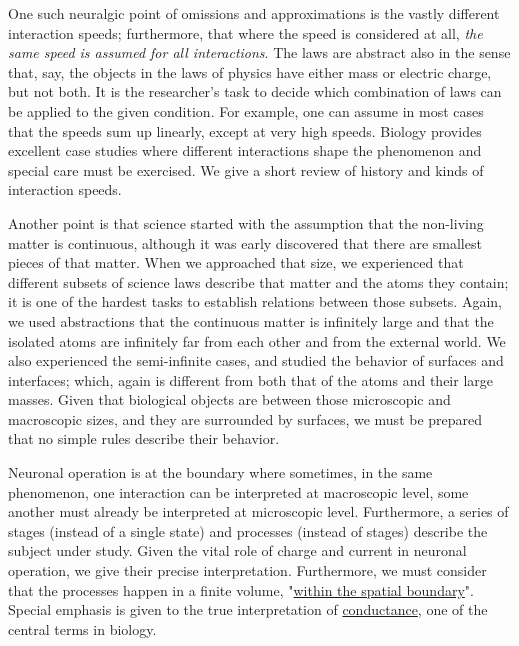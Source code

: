 {
One such neuralgic point of omissions and approximations is  the vastly different
{interaction speeds};
furthermore, that where the speed is considered at all, \textit{the same speed is assumed for all interactions}.
The laws are abstract also in the sense that, say, the objects in the laws of physics have either mass or
electric charge, but not both. It is the researcher's task to decide
which combination of laws
can be applied to the given condition. For example, one can assume in most cases
that the speeds sum up linearly, except at very high speeds.
Biology provides excellent case studies where different interactions
shape the phenomenon and special care must be exercised.
We give a short review of 
{history and kinds of interaction speeds}.

Another point is that science started with the assumption that
the non-living matter is continuous, although it was early
discovered that there are smallest pieces of that matter.
When we approached that size, we experienced that different subsets
of science laws describe that matter and the atoms they contain;
it is one of the hardest tasks to establish relations between
those subsets. Again, we used abstractions that the 
continuous matter is infinitely large and that the isolated
atoms are infinitely far from each other and from the external world. We also experienced the semi-infinite cases, and studied
the behavior of surfaces and interfaces; which, again is different from both that of the atoms and their large masses. Given that biological objects are between those microscopic and macroscopic sizes, and they are surrounded by surfaces, we must be prepared that no simple rules describe their behavior.
}

Neuronal operation is at the boundary where sometimes, in the same phenomenon,
one interaction can be interpreted at macroscopic level, some another
must already be interpreted at microscopic level.
Furthermore, a series of stages (instead of a single state) and
processes (instead of stages) describe the subject under study.
Given the vital role of %
{charge and current} in neuronal operation,
we give their precise interpretation.
Furthermore, we must consider that the processes happen in a finite volume,
"\hyperlink{ChangingResources}
{within the spatial boundary}".
Special emphasis is given to the true interpretation of 
\hyperlink{electric_conductance}
{conductance},
one of the central terms in biology.


